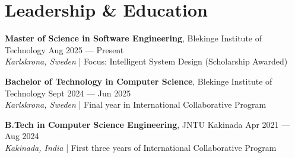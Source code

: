 \documentclass[11pt, a4paper]{article}
\begin{document}
\section*{Leadership \& Education}

\textbf{Master of Science in Software Engineering}, Blekinge Institute of Technology \hfill Aug 2025 --- Present \\
\textit{Karlskrona, Sweden} | Focus: Intelligent System Design (Scholarship Awarded)

\textbf{Bachelor of Technology in Computer Science}, Blekinge Institute of Technology \hfill Sept 2024 --- Jun 2025 \\
\textit{Karlskrona, Sweden} | Final year in International Collaborative Program

\textbf{B.Tech in Computer Science Engineering}, JNTU Kakinada \hfill Apr 2021 --- Aug 2024 \\
\textit{Kakinada, India} | First three years of International Collaborative Program
\end{document}
